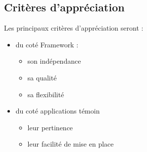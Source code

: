 \subsection{Critères d’appréciation}

Les principaux critères d'appréciation seront : 

\begin{itemize}
 \item du coté Framework :
 \begin{itemize} 
  \item son indépendance
  \item sa qualité
  \item sa flexibilité
 \end{itemize} 
 
 \item du coté applications témoin
 \begin{itemize}
  \item leur pertinence
  \item leur facilité de mise en place
 \end{itemize}
\end{itemize}


